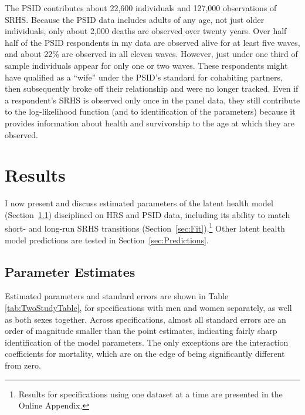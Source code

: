 \documentclass[12pt,pdftex,letterpaper]{article}
\newcommand{\RootDir}{..}
\newcommand{\TablesDir}{\RootDir/Tables}
\begin{document}
The PSID contributes about 22,600 individuals and 127,000 observations of SRHS.  Because the PSID data includes adults of any age, not just older individuals, only about 2,000 deaths are observed over twenty years. Over half half of the PSID respondents in my data are observed alive for at least five waves, and about 22\% are observed in all eleven waves.  However, just under one third of sample individuals appear for only one or two waves.  These respondents might have qualified as a ``wife'' under the PSID's standard for cohabiting partners, then subsequently broke off their relationship and were no longer tracked. Even if a respondent's SRHS is observed only once in the panel data, they still contribute to the log-likelihood function (and to identification of the parameters) because it provides information about health and survivorship to the age at which they are observed.


\section{Results}\label{sec:Results}

I now present and discuss estimated parameters of the latent health model (Section~\ref{sec:Parameters}) disciplined on HRS and PSID data, including its ability to match short- and long-run SRHS transitions (Section~\ref{sec:Fit}).\footnote{Results for specifications using one dataset at a time are presented in the Online Appendix.} Other latent health model predictions are tested in Section~\ref{sec:Predictions}.

\subsection{Parameter Estimates}\label{sec:Parameters}

Estimated parameters and standard errors are shown in Table \ref{tab:TwoStudyTable}, for specifications with men and women separately, as well as both sexes together. Across specifications, almost all standard errors are an order of magnitude smaller than the point estimates, indicating fairly sharp identification of the model parameters.  The only exceptions are the interaction coefficients for mortality, which are on the edge of being significantly different from zero.


\end{document}
